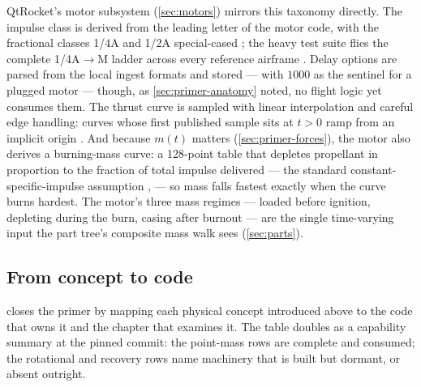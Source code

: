 QtRocket's motor subsystem (\cref{sec:motors}) mirrors this taxonomy directly. The impulse
class is derived from the leading letter of the motor code, with the fractional classes
1/4A and 1/2A special-cased ; the heavy test suite flies the
complete 1/4A$\to$M ladder across every reference airframe
. Delay options are parsed from the local ingest
formats and stored --- with $1000$ as the sentinel for a plugged motor
 --- though, as \cref{sec:primer-anatomy} noted, no flight
logic yet consumes them. The thrust curve is sampled with linear interpolation and careful
edge handling: curves whose first published sample sits at $t > 0$ ramp from an implicit
origin . And because $m(t)$ matters
(\cref{sec:primer-forces}), the motor also derives a burning-mass curve: a 128-point table
that depletes propellant in proportion to the fraction of total impulse delivered --- the
standard constant-specific-impulse assumption ,
 --- so mass falls fastest exactly when the curve burns
hardest. The motor's three mass regimes --- loaded before ignition, depleting during the
burn, casing after burnout  --- are the single time-varying
input the part tree's composite mass walk sees (\cref{sec:parts}).

\subsection{From concept to code}\label{sec:primer-map}

 closes the primer by mapping each physical concept introduced above
to the code that owns it and the chapter that examines it. The table doubles as a capability
summary at the pinned commit: the point-mass rows are complete and consumed; the rotational
and recovery rows name machinery that is built but dormant, or absent outright.

